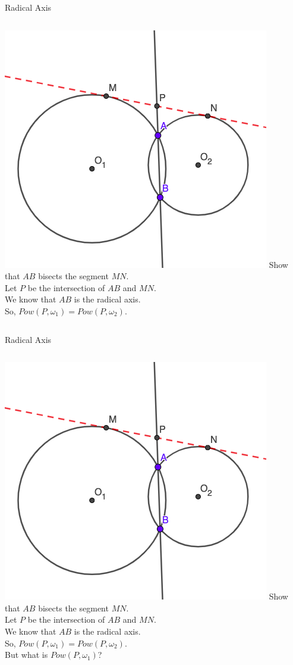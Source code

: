 \documentclass{beamer}
\begin{document}
\begin{frame}{Radical Axis}
	\begin{columns}
		\includegraphics[scale=0.4]{rad3.png}
		Show that $AB$ bisects the segment $MN$.\\
		\phantom{Spacing}
		Let $P$ be the intersection of $AB$ and $MN$.\\
		We know that $AB$ is the radical axis.\\
		So, $Pow(P, \omega_1) = Pow(P, \omega_2)$.
	\end{columns}
\end{frame}
\begin{frame}{Radical Axis}
	\begin{columns}
		\column{0.6\textwidth}
		\includegraphics[scale=0.4]{rad3.png}
		\column{0.4\textwidth}
		Show that $AB$ bisects the segment $MN$.\\
		\phantom{Spacing}
		Let $P$ be the intersection of $AB$ and $MN$.\\
		We know that $AB$ is the radical axis.\\
		So, $Pow(P, \omega_1) = Pow(P, \omega_2)$.\\
		\phantom{Spacing}
		But what is $Pow(P,\omega_1)$?
	\end{columns}
\end{frame}
\end{document}
